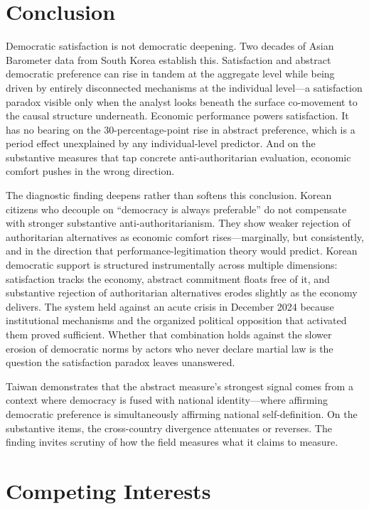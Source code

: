 \documentclass[
  12pt,
  12pt,
  letterpaper]{article}
\begin{document}
\section{Conclusion}\label{conclusion}

Democratic satisfaction is not democratic deepening. Two decades of
Asian Barometer data from South Korea establish this. Satisfaction and
abstract democratic preference can rise in tandem at the aggregate level
while being driven by entirely disconnected mechanisms at the individual
level---a satisfaction paradox visible only when the analyst looks
beneath the surface co-movement to the causal structure underneath.
Economic performance powers satisfaction. It has no bearing on the
30-percentage-point rise in abstract preference, which is a period
effect unexplained by any individual-level predictor. And on the
substantive measures that tap concrete anti-authoritarian evaluation,
economic comfort pushes in the wrong direction.

The diagnostic finding deepens rather than softens this conclusion.
Korean citizens who decouple on ``democracy is always preferable'' do
not compensate with stronger substantive anti-authoritarianism. They
show weaker rejection of authoritarian alternatives as economic comfort
rises---marginally, but consistently, and in the direction that
performance-legitimation theory would predict. Korean democratic support
is structured instrumentally across multiple dimensions: satisfaction
tracks the economy, abstract commitment floats free of it, and
substantive rejection of authoritarian alternatives erodes slightly as
the economy delivers. The system held against an acute crisis in
December 2024 because institutional mechanisms and the organized
political opposition that activated them proved sufficient. Whether that
combination holds against the slower erosion of democratic norms by
actors who never declare martial law is the question the satisfaction
paradox leaves unanswered.

Taiwan demonstrates that the abstract measure's strongest signal comes
from a context where democracy is fused with national identity---where
affirming democratic preference is simultaneously affirming national
self-definition. On the substantive items, the cross-country divergence
attenuates or reverses. The finding invites scrutiny of how the field
measures what it claims to measure.

\section*{Competing Interests}\label{competing-interests}
\end{document}
